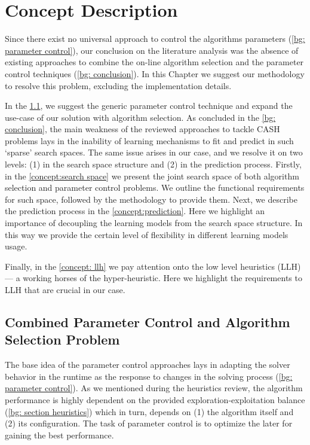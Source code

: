 \chapter{Concept Description}
Since there exist no universal approach to control the algorithms parameters (\cref{bg: parameter control}), our conclusion on the literature analysis was the absence of existing approaches to combine the on-line algorithm selection and the parameter control techniques (\cref{bg: conclusion}). In this Chapter we suggest our methodology to resolve this problem, excluding the implementation details.

In the \cref{concept:parameter control}, we suggest the generic parameter control technique and expand the use-case of our solution with algorithm selection. As concluded in the \cref{bg: conclusion}, the main weakness of the reviewed approaches to tackle CASH problems lays in the inability of learning mechanisms to fit and predict in such `sparse' search spaces. The same issue arises in our case, and we resolve it on two levels: (1) in the search space structure and (2) in the prediction process. Firstly, in the \cref{concept:search space} we present the joint search space of both algorithm selection and parameter control problems. We outline the functional requirements for such space, followed by the methodology to provide them. Next, we describe the prediction process in the \cref{concept:prediction}. Here we highlight an importance of decoupling the learning models from the search space structure. In this way we provide the certain level of flexibility in different learning models usage.

Finally, in the \cref{concept: llh} we pay attention onto the low level heuristics (LLH) — a working horses of the hyper-heuristic. Here we highlight the requirements to LLH that are crucial in our case.


\section{Combined Parameter Control and Algorithm Selection Problem}\label{concept:parameter control}
The base idea of the parameter control approaches lays in adapting the solver behavior in the runtime as the response to changes in the solving process (\cref{bg: parameter control}). As we mentioned during the heuristics review, the algorithm performance is highly dependent on the provided exploration-exploitation balance (\cref{bg: section heuristics}) which in turn, depends on (1) the algorithm itself and (2) its configuration. The task of parameter control is to optimize the later for gaining the best performance. 

